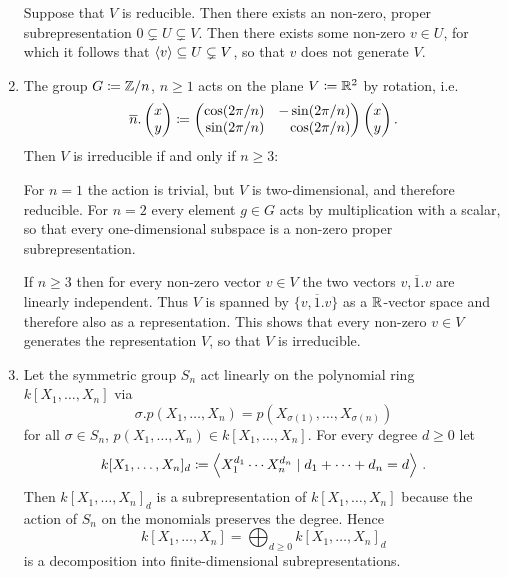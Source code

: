 \begin{example}
\begin{enumerate}
      Suppose that $V$ is reducible.
      Then there exists an non-zero, proper subrepresentation $0 \subsetneq U \subsetneq V$.
      Then there exists some non-zero $v \in U$, for which it follows that $\left\langle v \right\rangle \subseteq U \subsetneq V$, so that $v$ does not generate $V$.
    \item
      The group $G \coloneqq \mathbb{Z}/n$, $n \geq 1$ acts on the plane $V \coloneqq \mathbb{R}^2$ by rotation, i.e.
      \[
                  \overline{n}.\vect{x \\ y}
        \defined  \begin{pmatrix*}[r]
                    \cos(2\pi/n)  & -\sin(2\pi/n) \\
                    \sin(2\pi/n)  &  \cos(2\pi/n)
                  \end{pmatrix*}
                  \vect{x \\ y}.
      \]
      Then $V$ is irreducible if and only if $n \geq 3$:
      
      For $n = 1$ the action is trivial, but $V$ is two-dimensional, and therefore reducible.
      For $n = 2$ every element $g \in G$ acts by multiplication with a scalar, so that every one-dimensional subspace is a non-zero proper subrepresentation.
      
      If $n \geq 3$ then for every non-zero vector $v \in V$ the two vectors $v, \overline{1}.v$ are linearly independent.
      Thus $V$ is spanned by $\{v, \overline{1}.v\}$ as a $\mathbb{R}$-vector space and therefore also as a representation.
      This shows that every non-zero $v \in V$ generates the representation $V$, so that $V$ is irreducible.
    \item
      Let the symmetric group $S_n$ act linearly on the polynomial ring $k[X_1, \dotsc, X_n]$ via
      \[
          \sigma.p(X_1, \dotsc, X_n)
        = p(X_{\sigma(1)}, \dotsc, X_{\sigma(n)})
      \]
      for all $\sigma \in S_n$, $p(X_1, \dotsc, X_n) \in k[X_1, \dotsc, X_n]$.
      For every degree $d \geq 0$ let
      \[
                  k[X_1, \dotsc, X_n]_d
        \coloneqq  \left\langle  X_1^{d_1} \dotsm X_n^{d_n} \mid d_1 + \dotsb + d_n = d  \right\rangle \,.
      \]
      Then $k[X_1, \dotsc, X_n]_d$ is a subrepresentation of $k[X_1, \dotsc, X_n]$ because the action of $S_n$ on the monomials preserves the degree.
      Hence
      \[
          k[X_1, \dotsc, X_n]
        = \bigoplus_{d \geq 0} k[X_1, \dotsc, X_n]_d
      \]
      is a decomposition into finite-dimensional subrepresentations.
  \end{enumerate}
\end{example}


